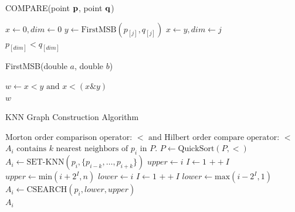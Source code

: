 \documentclass[10pt]{article}
\begin{document}
\begin{algorithm}
  \caption{COMPARE(point ${\bf p}$, point ${\bf q}$)}
  \label{compare}
  \begin{algorithmic}[1]
    \State $x \leftarrow 0, dim \leftarrow 0$
    \State $y \leftarrow \text{FirstMSB}(p_{[j]}, q_{[j]})$
    \State $x \leftarrow y, dim \leftarrow j$
    \EndIf 
    \EndFor \\
    \Return $p_{[dim]} < q_{[dim]}$
  \end{algorithmic}
\end{algorithm}

\begin{algorithm}
  \caption{FirstMSB(double $a$, double $b$)}
  \label{first-msb}
  \begin{algorithmic}[1]
    \State $w \leftarrow x < y \text{ and } x < (x \mathrel{\&} y)$ \\
    \Return $w$
  \end{algorithmic}
\end{algorithm}

\begin{algorithm}
  \caption{KNN Graph Construction Algorithm}
  \label{knn-graph-alg}
  \begin{algorithmic}[1]
    \Require $\text{Morton order comparison operator: } < 
    \text{ and Hilbert order compare operator: } <$
    \Ensure $A_i \text{ contains } k \text{ nearest neighbors of } p_i \text{ in } P \text{.}$
    \State $P \leftarrow \text{QuickSort}(P, <)$
    \State $A_i \leftarrow \text{SET-KNN}(p_i, \{p_{i-k}, \dots, p_{i+k} \})$
    \State $upper \leftarrow i$
    \Else
    \State $I \leftarrow 1$
    \State $++I$
    \EndWhile
    \State $upper \leftarrow \text{min}(i+2^I, n)$
    \EndIf
    \State $lower \leftarrow i$
    \Else
    \State $I \leftarrow 1$
    \State $++I$
    \EndWhile
    \State $lower \leftarrow \text{max}(i-2^I, 1)$
    \EndIf
    \State $A_i \leftarrow \text{CSEARCH}(p_i, lower, upper)$
    \EndIf
    \EndFor \\
    \Return $A_i$
  \end{algorithmic}
\end{algorithm}
\end{document}
